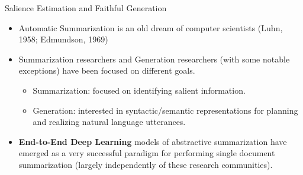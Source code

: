 \begin{frame}{Salience Estimation and Faithful Generation}

\begin{itemize}

\item Automatic Summarization is an old dream of computer scientists (Luhn, 1958; Edmundson, 1969) 

\vspace{20pt}

\item Summarization researchers and Generation researchers
    (with some notable exceptions) have been focused on different goals.

\begin{itemize}

  \item Summarization: focused on identifying salient information.
  \item Generation: interested in syntactic/semantic representations for
        planning and realizing natural language utterances.

\end{itemize}

\vspace{20pt}

\item \textbf{End-to-End Deep Learning} models of abstractive summarization
    have emerged as a very successful paradigm for performing single document
    summarization (largely independently of these research communities).
        
\end{itemize}
\end{frame}

